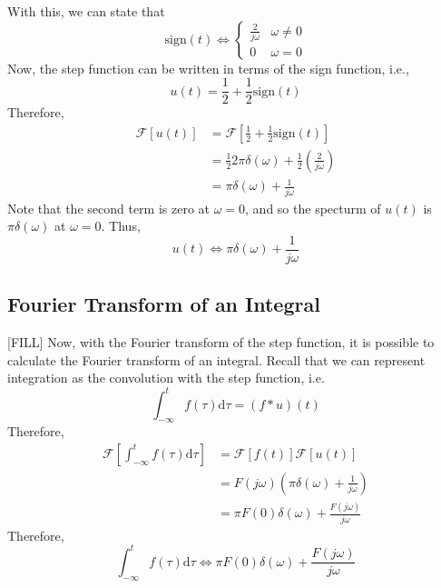 \documentclass[10pt]{article}
\newcommand{\llra}{\Longleftrightarrow}
\newcommand{\fourier}{\mathcal{F}}
\newcommand{\dd}{\text{d}}
\begin{document}
With this, we can state that
\[\text{sign}(t) \llra \begin{cases} \frac{2}{j\omega} & \omega \neq 0 \\ 0 & \omega = 0\end{cases}\]
Now, the step function can be written in terms of the sign function, i.e.,
\[u(t) = \frac{1}{2} + \frac{1}{2} \text{sign}(t)\]
Therefore,
\begin{align*}
    \fourier[u(t)] &= \fourier\left[\frac{1}{2} + \frac{1}{2} \text{sign}(t)\right]\\
    &= \frac{1}{2}2\pi \delta(\omega) + \frac{1}{2} \left(\frac{2}{j\omega}\right)\\
    &= \pi \delta(\omega) + \frac{1}{j\omega}
\end{align*}
Note that the second term is zero at $\omega = 0$, and so the specturm of $u(t)$ is $\pi\delta(\omega)$ at $\omega = 0$.  Thus,
\[u(t) \llra \pi \delta(\omega) + \frac{1}{j\omega}\]

\subsection*{Fourier Transform of an Integral}
[FILL]
Now, with the Fourier transform of the step function, it is possible to calculate the Fourier transform of an integral.  Recall that we can represent integration as the convolution with the step function, i.e.
\[\int_{-\infty}^t f(\tau) \dd \tau = (f * u)(t)\]
Therefore,
\begin{align*}
    \fourier\left[\int_{-\infty}^t f(\tau) \dd \tau\right] &= \fourier[f(t)] \fourier[u(t)]\\
    &= F(j\omega)\left(\pi \delta(\omega) + \frac{1}{j\omega}\right)\\
    &= \pi F(0) \delta(\omega) + \frac{F(j\omega)}{j\omega}
\end{align*}
Therefore,
\[\boxed{\int_{-\infty}^t f(\tau) \dd \tau \llra \pi F(0) \delta(\omega) + \frac{F(j\omega)}{j\omega}}\]
\end{document}
